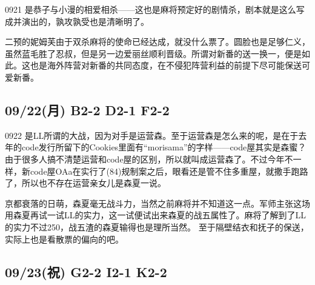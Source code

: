 0921 是恭子与小漫的相爱相杀——这也是麻将预定好的剧情杀，剧本就是这么写成并演出的，孰攻孰受也是清晰明了。

二预的妮姆芙由于双杀麻将的使命已经达成，就没什么票了。圆脸也是足够仁义，虽然蓝毛胜了忍叔，但是另一边爱丽丝顺利晋级。所谓对新番的送一换一，便是如此。这也是海外阵营对新番的共同态度，在不侵犯阵营利益的前提下尽可能保送可爱新番。

\subsection{09/22(月) B2-2 D2-1 F2-2}


0922 是LL所谓的大战，因为对手是运营森。至于运营森是怎么来的呢，是在于去年的code发行所留下的Cookies里面有“morisama”的字样——code屋其实是森蜜？由于很多人搞不清楚运营和code屋的区别，所以就叫成运营森了。不过今年不一样，新code屋OAa在实行了(84)规制案之后，眼看还是管不住多重屋，就撒手跑路了，所以也不存在运营亲女儿是森夏一说。

京都衰落的日萌，森夏毫无战斗力，当然之前麻将并不知道这一点。军师主张这场用森夏再试一试LL的实力，这一试便试出来森夏的战五属性了。麻将了解到了LL的实力不过250，战五渣的森夏输得也是理所当然。
至于隔壁结衣和抚子的保送，实际上也是看散票的偏向的吧。

\subsection{09/23(祝) G2-2 I2-1 K2-2}

